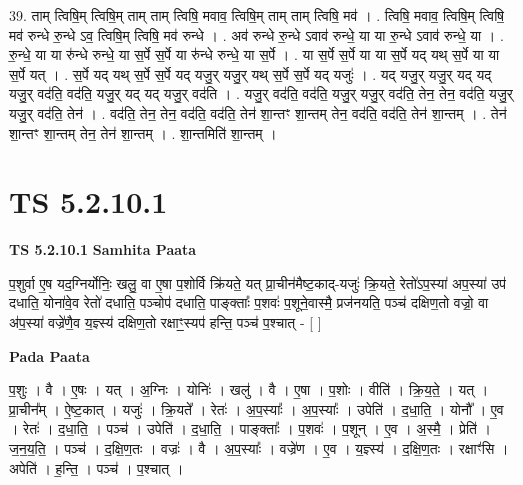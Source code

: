 \documentclass[17pt]{extarticle}
\begin{document}
39. ताम् त्विषि॒म् त्विषि॒म् ताम् ताम् त्विषि॒ मवाव॒ त्विषि॒म् ताम् ताम् त्विषि॒ मव॑ । . त्विषि॒ मवाव॒ त्विषि॒म् त्विषि॒ मव॑ रुन्धे रु॒न्धे ऽव॒ त्विषि॒म् त्विषि॒ मव॑ रुन्धे । . अव॑ रुन्धे रु॒न्धे ऽवाव॑ रुन्धे॒ या या रु॒न्धे ऽवाव॑ रुन्धे॒ या । . रु॒न्धे॒ या या रु॑न्धे रुन्धे॒ या स॒र्पे स॒र्पे या रु॑न्धे रुन्धे॒ या स॒र्पे । . या स॒र्पे स॒र्पे या या स॒र्पे यद् यथ् स॒र्पे या या स॒र्पे यत् । . स॒र्पे यद् यथ् स॒र्पे स॒र्पे यद् यजु॒र् यजु॒र् यथ् स॒र्पे स॒र्पे यद् यजुः॑ । . यद् यजु॒र् यजु॒र् यद् यद् यजु॒र् वद॑ति॒ वद॑ति॒ यजु॒र् यद् यद् यजु॒र् वद॑ति । . यजु॒र् वद॑ति॒ वद॑ति॒ यजु॒र् यजु॒र् वद॑ति॒ तेन॒ तेन॒ वद॑ति॒ यजु॒र् यजु॒र् वद॑ति॒ तेन॑ । . वद॑ति॒ तेन॒ तेन॒ वद॑ति॒ वद॑ति॒ तेन॑ शा॒न्तꣳ शा॒न्तम् तेन॒ वद॑ति॒ वद॑ति॒ तेन॑ शा॒न्तम् । . तेन॑ शा॒न्तꣳ शा॒न्तम् तेन॒ तेन॑ शा॒न्तम् । . शा॒न्तमिति॑ शा॒न्तम् । \newline
\pagebreak
{}

\section{ TS 5.2.10.1 }

\textbf{TS 5.2.10.1 } \newline
\textbf{Samhita Paata} \newline

प॒शुर्वा ए॒ष यद॒ग्निर्योनिः॒ खलु॒ वा ए॒षा प॒शोर्वि क्रि॑यते॒ यत् प्रा॒चीन॑मैष्ट॒काद्-यजुः॑ क्रि॒यते॒ रेतो॑ऽप॒स्या॑ अप॒स्या॑ उप॑ दधाति॒ योना॑वे॒व रेतो॑ दधाति॒ पञ्चोप॑ दधाति॒ पाङ्क्ताः᳚ प॒शवः॑ प॒शूने॒वास्मै॒ प्रज॑नयति॒ पञ्च॑ दक्षिण॒तो वज्रो॒ वा अ॑प॒स्या॑ वज्रे॑णै॒व य॒ज्ञ्स्य॑ दक्षिण॒तो रक्षाꣳ॒॒स्यप॑ हन्ति॒ पञ्च॑ प॒श्चात् - [  ] \newline

\textbf{Pada Paata} \newline

प॒शुः । वै । ए॒षः । यत् । अ॒ग्निः । योनिः॑ । खलु॑ । वै । ए॒षा । प॒शोः । वीति॑ । क्रि॒य॒ते॒ । यत् । प्रा॒चीन᳚म् । ऐ॒ष्ट॒कात् । यजुः॑ । क्रि॒यते᳚ । रेतः॑ । अ॒प॒स्याः᳚ । अ॒प॒स्याः᳚ । उपेति॑ । द॒धा॒ति॒ । योनौ᳚ । ए॒व । रेतः॑ । द॒धा॒ति॒ । पञ्च॑ । उपेति॑ । द॒धा॒ति॒ । पाङ्क्ताः᳚ । प॒शवः॑ । प॒शून् । ए॒व । अ॒स्मै॒ । प्रेति॑ । ज॒न॒य॒ति॒ । पञ्च॑ । द॒क्षि॒ण॒तः । वज्रः॑ । वै । अ॒प॒स्याः᳚ । वज्रे॑ण । ए॒व । य॒ज्ञ्स्य॑ । द॒क्षि॒ण॒तः । रक्षाꣳ॑सि । अपेति॑ । ह॒न्ति॒ । पञ्च॑ । प॒श्चात् ।  \newline
\end{document}
